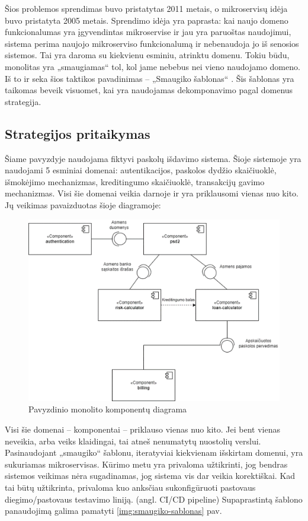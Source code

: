 \documentclass{VUMIFPSbakalaurinis}
\begin{document}
Šios problemos sprendimas buvo pristatytas 2011 metais, o mikroservisų idėja buvo pristatyta 2005 metais. Sprendimo idėja yra paprasta: kai naujo domeno funkcionalumas yra įgyvendintas mikroservise ir jau yra paruoštas naudojimui, sistema perima naujojo mikroserviso funkcionalumą ir nebenaudoja jo iš senosios sistemos. Tai yra daroma su kiekvienu esminiu, atrinktu domenu. Tokiu būdu, monolitas yra „smaugiamas“ tol, kol jame nebebus nei vieno naudojamo domeno. Iš to ir seka šios taktikos pavadinimas – „Smaugiko šablonas“ \cite{Beh18}. Šis šablonas yra taikomas beveik visuomet, kai yra naudojamas dekomponavimo pagal domenus strategija.

\subsection{Strategijos pritaikymas}
Šiame pavyzdyje naudojama fiktyvi paskolų išdavimo sistema. Šioje sistemoje yra naudojami 5 esminiai domenai: autentikacijos, paskolos dydžio skaičiuoklė, išmokėjimo mechanizmas, kreditingumo skaičiuoklė, transakcijų gavimo mechanizmas. Visi šie domenai veikia darnoje ir yra priklausomi vienas nuo kito. Jų veikimas pavaizduotas šioje diagramoje:
\begin{figure}[H]
    \centering
    \includegraphics[scale=0.9]{img/komponentu-diagrama.png}
    \caption{Pavyzdinio monolito komponentų diagrama}
    \label{img:komponentu-diagrama}
\end{figure}

Visi šie domenai – komponentai – priklauso vienas nuo kito. Jei bent vienas neveikia, arba veiks klaidingai, tai atneš nenumatytų nuostolių verslui. Pasinaudojant „smaugiko“ šablonu, iteratyviai kiekvienam išskirtam domenui, yra sukuriamas mikroservisas. Kūrimo metu yra privaloma užtikrinti, jog bendras sistemos veikimas nėra sugadinamas, jog sistema vis dar veikia korektiškai. Kad tai būtų užtikrinta, privaloma kuo anksčiau sukonfigūruoti pastovaus diegimo/pastovaus testavimo liniją. (angl. CI/CD pipeline)  Supaprastintą šablono panaudojimą galima pamatyti \ref{img:smaugiko-sablonas} pav.
\end{document}

